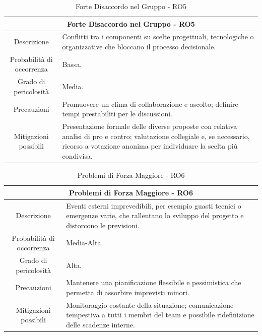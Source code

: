 \documentclass[12pt, a4paper]{article}
\begin{document}
\begin{table}[H]
    \centering
    \renewcommand{\arraystretch}{1.3}
    \begin{tabularx}{\textwidth}{|c|X|}
        \hline
        \multicolumn{2}{|c|}{\textbf{Forte Disaccordo nel Gruppo - RO5}} \\ \hline
        Descrizione & 
        Conflitti tra i componenti su scelte progettuali, tecnologiche o
        organizzative che bloccano il processo decisionale. \\ \hline
        Probabilità di occorrenza & Bassa. \\ \hline
        Grado di pericolosità & Media. \\ \hline
        Precauzioni &
        Promuovere un clima di collaborazione e ascolto; definire tempi
        prestabiliti per le discussioni. \\ \hline
        Mitigazioni possibili & 
        Presentazione formale delle diverse proposte con relativa analisi di pro
        e contro; valutazione collegiale e, se necessario, ricorso a votazione
        anonima per individuare la scelta più condivisa.\\ \hline
    \end{tabularx}
    \caption{Forte Disaccordo nel Gruppo - RO5}
\end{table}

\begin{table}[H]
    \centering
    \renewcommand{\arraystretch}{1.3}
    \begin{tabularx}{\textwidth}{|c|X|}
        \hline
        \multicolumn{2}{|c|}{\textbf{Problemi di Forza Maggiore - RO6}} \\ \hline
        Descrizione & 
        Eventi esterni imprevedibili, per esempio guasti tecnici o emergenze
        varie, che rallentano lo sviluppo del progetto e distorcono le
        previsioni. \\ \hline
        Probabilità di occorrenza & Media-Alta. \\ \hline
        Grado di pericolosità & Alta. \\ \hline
        Precauzioni & 
        Mantenere una pianificazione flessibile e pessimistica che permetta di
        assorbire imprevisti minori. \\ \hline
        Mitigazioni possibili &
        Monitoraggio costante della situazione; comunicazione tempestiva a tutti
        i membri del team e possibile ridefinizione delle scadenze interne. \\ \hline
    \end{tabularx}
    \caption{Problemi di Forza Maggiore - RO6}
\end{table}
\end{document}
